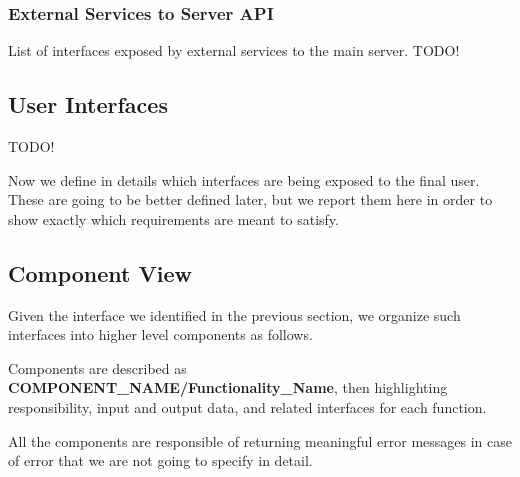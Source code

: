 \documentclass[11pt]{article} %
\begin{document}
\subsubsection{External Services to Server API}
List of interfaces exposed by external services to the main server. {\color{red} {TODO! }}


\subsection{User Interfaces}

{\color{red} {TODO! }}

Now we define in details which interfaces are being exposed to the final user. These are going to be better defined later, but we report them here in order to show exactly which requirements are meant to satisfy.


















\subsection{Component View}
Given the interface we identified in the previous section, we organize such interfaces into higher level components as follows.

Components are described as \textbf{COMPONENT\_NAME/Functionality\_Name}, then highlighting responsibility, input and output data, and related interfaces for each function.

All the components are responsible of returning meaningful error messages in case of error that we are not going to specify in detail.
\end{document}
